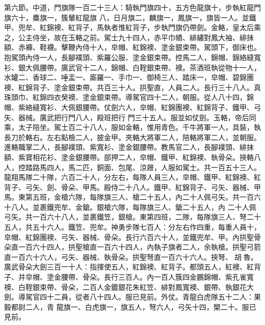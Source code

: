 \begin{pinyinscope}
 第六節。中道，門旗隊一百二十三人：騎執門旗四十，五方色龍旗十，步執紅龍門旗六十，麋旗一，簇輦紅龍旗
 八，日月旗二，麟旗一，鳳旗一，旗皆一人。並鐵甲、兜牟、紅錦襖、紅背子，馬執者惟紅背子，步執門旗仍帶劍。金輅，皇太后乘之，公主侍坐，故在玉輅之前。駕士九十四人，赤平巾幘、緋繡對鳳大袖、緋抹額、赤褲、鞋襪。擊鞭內侍十人，皁帽、紅錦襖、塗金銀束帶。駕頭下，御床也。抱駕頭內侍一人，長腳襆頭、紫羅公服、塗金銀束帶。控馬二人，錦帽、錦絡縫寬衫、銀大佩腰帶。廣武官十二人，錦帽、白鞓銀束帶、襖。茶酒班執從物十一人，水罐二、香球二、唾盂一、廝羅一、手巾一、御椅三人、踏床一，皁帽、碧錦團襖、紅錦背子、塗金銀束帶。共百三十人。拱聖直，人員二人。長行三十八人。真珠頭巾、紅錦四衣癸襖、塗金銀束帶。導駕官四十二人，朝服。從人八十四，錦帽、紫絡縫寬衫、大佩銀腰帶。仗劍六人，皁帽、紅錦團襖、紅錦背子、鐵甲、弓矢、器械。廣武把行門八人，殿班把行
 門三十五人。服並如仗劍。玉輅，帝后同乘，太子陪坐。駕士百二十八人，服如金輅，惟用青色。千牛將軍一人，具裝，執長刀於輅右。左右點檢二人，披金甲。夾輅大將軍二人，陪輅將軍二人，並朝服。進輅職掌二人，長腳襆頭、紫寬衫、塗金銀腰帶。教馬官二人，長腳襆頭、緋抹額、紫寶相花衫、塗金銀腰帶。部押二人，皁帽、鐵甲、紅錦襖、執骨朵。挾輅八人，控踏路馬四人，馬二匹，銅面、包尾、涼屜，人服如駕士。共一百五十三人。龍翔馬隊二十隊，六百二十人，分左右，每隊人員三人，皁帽、鐵甲、紅錦襖、紅背子、弓矢、劍、骨朵、甲馬。殿侍二十八人。鐵甲、紅錦背子、弓矢、器械、甲馬。東第五班，金槍六隊，每隊旗三人、槍二十五人，內二十人佩弓矢。共一百六十八人。並裹鐵兜牟、金鎗。銀槍六隊，每隊旗三人、鎗二十五人，內
 二十人佩弓矢。共一百六十八人，並裹鐵笠，銀槍。東第四班，二隊，每隊旗三人、弩二十五人，共五十六人。鐵笠、兜牟。神勇步隊七百人：分左右作四重，每重人員十，皁帽、紅錦團襖、弓矢、器械、骨朵。長行六百六十人，並鐵兜牟、甲。內拱聖骨朵直一百六十四人，拱聖槍直一百六十四人，內執子旗者二人，余執槍。拱聖弓箭直一百六十六人，弓矢、器械、執骨朵。拱聖弩直一百六十六人。挾弩、胡魯。廣武骨朵大劍三百一十人：指揮使五人，紅錦襖、紅背子。都頭五人，紅襖、紅背子、并皁帽、塗金腰帶、骨朵。長行三百人。內一百人簇四金鵬錦帽、紫孔雀寬襖、白鞓銀束帶、骨朵，二百人金鍍銀花朱紅笠、緋對鳳寬襖、銀帶、執銀花大劍。導駕官四十二員，從者八十四人。服已見前。外仗。青龍白虎隊五十二人：果毅都尉二人，青
 龍旗一、白虎旗一，旗五人，弩六人，弓矢十四，槊二十。服已見前。




\end{pinyinscope}
